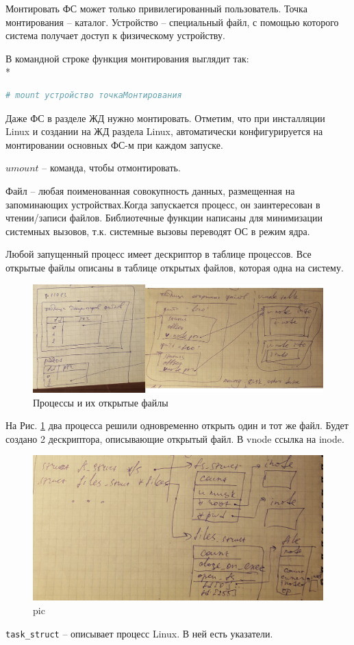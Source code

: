 Монтировать ФС может только привилегированный пользователь.  Точка монтирования – каталог. Устройство – специальный файл, с помощью которого система получает доступ к физическому устройству. 

В командной строке функция монтирования выглядит так:\\* 
\begin{lstlisting}[language=bash]
# mount устройство точкаМонтирования
\end{lstlisting}

Даже ФС в разделе ЖД нужно монтировать. Отметим, что при инсталляции Linux и создании на ЖД раздела Linux, автоматически конфигурируется на монтировании основных ФС-м при каждом запуске.

$umount$ – команда, чтобы отмонтировать.

Файл – любая поименованная совокупность данных, размещенная на запоминающих устройствах.Когда запускается процесс, он заинтересован в чтении/записи файлов. Библиотечные функции написаны для минимизации системных вызовов, т.к. системные вызовы переводят ОС в режим ядра.

Любой запущенный процесс имеет дескриптор в таблице процессов. Все открытые файлы описаны в таблице открытых файлов, которая одна на систему.

\begin{figure}[H]
  \centering
  \includegraphics[width=\textwidth]{pic/3.png}
  \caption{Процессы и их открытые файлы}
  \label{pic:proc_open_file}
\end{figure}

На Рис. \ref{pic:proc_open_file} два процесса решили одновременно открыть один и тот же файл. Будет создано 2 дескриптора, описывающие открытый файл. В vnode ссылка на inode.

\begin{figure}[H]
  \centering
  \includegraphics[width=\textwidth]{pic/4.png}
  \caption{pic}
  \label{pic:task_struct}
\end{figure}

\verb|task_struct| – описывает процесс Linux. В ней есть указатели.

 


